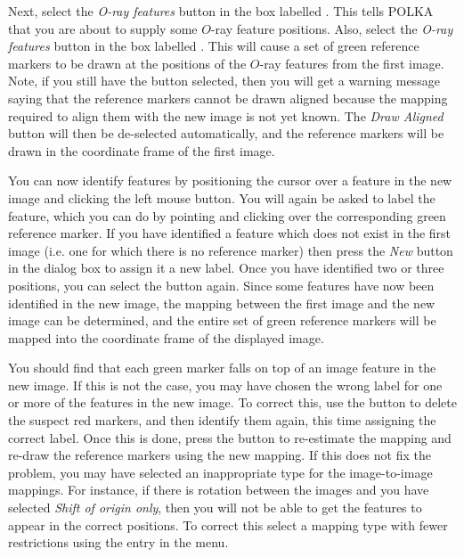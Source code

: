\documentclass[11pt,nolof]{starlink}
\begin{document}
Next, select the \emph{O-ray features} button in the box labelled
. This tells POLKA that you are
about to supply some $O$-ray feature positions. Also, select the
\emph{O-ray features} button in the box labelled
. This will cause
a set of green reference markers to be drawn at the positions of the
$O$-ray features from the first image. Note, if you still have the
 button selected, then
you will get a warning message saying that the reference markers cannot
be drawn aligned because the mapping required to align them with the new
image is not yet known. The \emph{Draw Aligned} button will then be
de-selected automatically, and the reference markers will be drawn in the
coordinate frame of the first image.

You can now identify features by positioning the cursor over a feature in
the new image and clicking the left mouse button. You will again be asked
to label the feature, which you can do by pointing and clicking over the
corresponding green reference marker. If you have identified a feature
which does not exist in the first image (i.e. one for which there is no
reference marker) then press the \emph{New} button in the  dialog box to assign it a new
label. Once you have identified two or three positions, you can select
the  button again. Since
some features have now been identified in the new image, the mapping
between the first image and the new image can be determined, and the
entire set of green reference markers will be mapped into the coordinate
frame of the displayed image.

You should find that each green marker falls on top of an image feature
in the new image. If this is not the case, you may have chosen the wrong
label for one or more of the features in the new image. To correct this,
use the  button to delete the suspect
red markers, and then identify them again, this time assigning the
correct label. Once this is done, press the  button to re-estimate the mapping and re-draw the
reference markers using the new mapping. If this does not fix the
problem, you may have selected an inappropriate type for the
image-to-image mappings. For instance, if there is rotation between the
images and you have selected \emph{Shift of origin only}, then you will
not be able to get the features to appear in the correct positions. To
correct this select a mapping type with fewer restrictions using the
 entry in the  menu.
\end{document}
